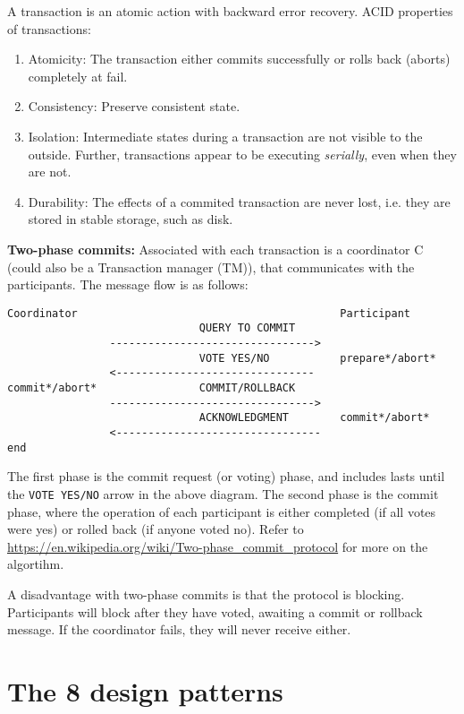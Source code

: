 A transaction is an atomic action with backward error recovery.
ACID properties of transactions:
\begin{enumerate}
    \item Atomicity: The transaction either commits successfully or rolls back (aborts) completely at fail.
    \item Consistency: Preserve consistent state.
    \item Isolation: Intermediate states during a transaction are not visible to the outside. Further, transactions appear to be executing \emph{serially}, even when they are not.
    \item Durability: The effects of a commited transaction are never lost, i.e. they are stored in stable storage, such as disk.
\end{enumerate}
\textbf{Two-phase commits:}
Associated with each transaction is a coordinator C (could also be a Transaction manager (TM)), that communicates with the participants. The message flow is as follows:
\begin{verbatim}
Coordinator                                         Participant
                              QUERY TO COMMIT
                -------------------------------->
                              VOTE YES/NO           prepare*/abort*
                <-------------------------------
commit*/abort*                COMMIT/ROLLBACK
                -------------------------------->
                              ACKNOWLEDGMENT        commit*/abort*
                <--------------------------------  
end
\end{verbatim}
The first phase is the commit request (or voting) phase, and includes lasts until the \texttt{VOTE YES/NO} arrow in the above diagram. The second phase is the commit phase, where the operation of each participant is either completed (if all votes were yes) or rolled back (if anyone voted no). Refer to \url{https://en.wikipedia.org/wiki/Two-phase_commit_protocol} for more on the algortihm.

A disadvantage with two-phase commits is that the protocol is blocking. Participants will block after they have voted, awaiting a commit or rollback message. If the coordinator fails, they will never receive either. 

\section{The 8 design patterns}
